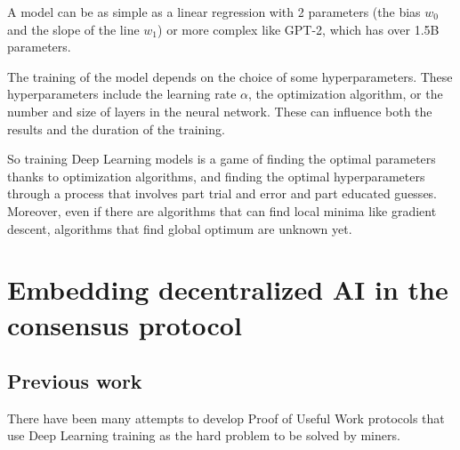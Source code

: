 \documentclass[conference]{IEEEtran}
\begin{document}
    A model can be as simple as a linear regression with 2 parameters (the bias $w_0$ and the slope of the line $w_1$) or more complex like GPT-2, which has over 1.5B parameters\cite{b5}.
    
    The training of the model depends on the choice of some hyperparameters. These hyperparameters include the learning rate $\alpha$, the optimization algorithm, or the number and size of layers in the neural network. These can influence both the results and the duration of the training.
    
    So training Deep Learning models is a game of finding the optimal parameters thanks to optimization algorithms, and finding the optimal hyperparameters through a process that involves part trial and error and part educated guesses. Moreover, even if there are algorithms that can find local minima like gradient descent, algorithms that find global optimum are unknown yet.
    
    \section{Embedding decentralized AI in the consensus protocol}
    \subsection{Previous work}
    There have been many attempts to develop Proof of Useful Work protocols that use Deep Learning training as the hard problem to be solved by miners.
    
\end{document}
